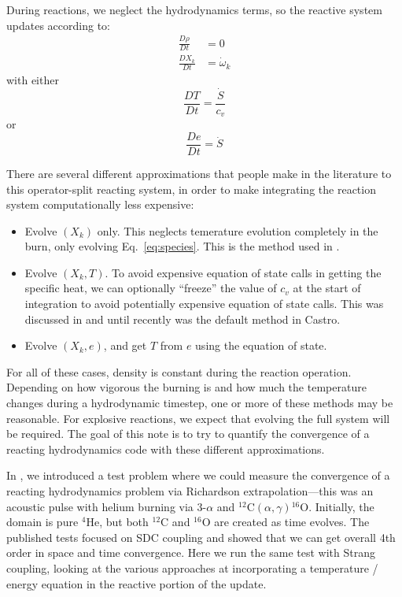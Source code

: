 \documentclass[times,preprint]{aastex63}
\newcommand{\castro}{{\sf Castro}}
\newcommand{\isotm}[2]{{}^{#2}\mathrm{#1}}
\newcommand{\omegadot}{\dot{\omega}}
\newcommand{\Sdot}{\dot{S}}
\newcommand{\MarginPar}[1]{\marginpar{\vskip-\baselineskip\raggedright\tiny\sffamily\hrule\smallskip{\color{red}#1}\par\smallskip\hrule}}
\begin{document}
During reactions, we neglect the hydrodynamics terms,
so the reactive system updates according to:
\begin{align}
\frac{D\rho}{Dt} &= 0 \\
\frac{DX_k}{Dt} &= \omegadot_k \label{eq:species}
\end{align}
with either
\begin{equation}
\frac{DT}{Dt} = \frac{\Sdot}{c_v}
\end{equation}
or
\begin{equation}
\frac{De}{Dt} = \Sdot
\end{equation}

There are several different approximations that people make in the
literature to this operator-split reacting system, in order to make
integrating the reaction system computationally less expensive:
\begin{itemize}
\item Evolve $(X_k)$ only.  This neglects temerature evolution
  completely in the burn, only evolving Eq.~\ref{eq:species}.  This is
  the method used in \citet{flash}. \MarginPar{other codes?}

\item Evolve $(X_k, T)$.  To avoid expensive equation of state calls
  in getting the specific heat, we can optionally ``freeze'' the value
  of $c_v$ at the start of integration to avoid potentially expensive
  equation of state calls.  This was discussed in \cite{Bell:2004} and
  until recently was the default method in \castro.

\item Evolve $(X_k, e)$, and get $T$ from $e$ using the equation of
  state.
\end{itemize}
For all of these cases, density is constant during the reaction operation.
Depending on how vigorous the burning is and how much the temperature
changes during a hydrodynamic timestep, one or more of these
methods may be reasonable.  For explosive reactions, we expect
that evolving the full system will be required.  The goal of this
note is to try to quantify the convergence of a reacting hydrodynamics
code with these different approximations.

In \citet{castro_sdc}, we introduced a test problem where we could
measure the convergence of a reacting hydrodynamics problem via
Richardson extrapolation---this was an acoustic pulse with helium
burning via $3$-$\alpha$ and
$\isotm{C}{12}(\alpha,\gamma)\isotm{O}{16}$.  Initially, the domain is
pure $\isotm{He}{4}$, but both $\isotm{C}{12}$ and $\isotm{O}{16}$ are
created as time evolves.  The published tests focused on SDC coupling
and showed that we can get overall 4th order in space and time
convergence.  Here we run the same test with Strang coupling, looking
at the various approaches at incorporating a temperature / energy equation in
the reactive portion of the update.
\end{document}
